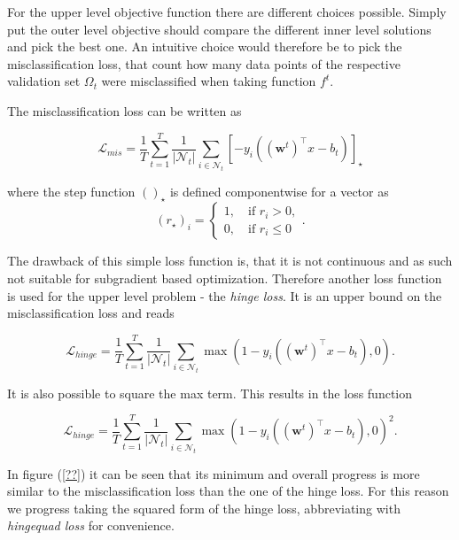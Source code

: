 For the upper level objective function there are different choices possible.
Simply put the outer level objective should compare the different inner level solutions and pick the best one. An intuitive choice would therefore be to pick the misclassification loss, that count how many data points of the respective validation set \(\Omega_t\) were misclassified when taking function \(f^t\).

The misclassification loss can be written as

\begin{equation}
	\mathcal{L}_{mis} = \frac{1}{T}\sum_{t=1}^T\frac{1}{|\mathcal{N}_t|}\sum_{i \in \mathcal{N}_t}{\left[-y_i((\bm{w}^t)^{\top}x-b_t)\right]_{\star}}
\label{misclass_loss}
\end{equation}

where the step function \(()_{\star}\) is defined componentwise for a vector as
\begin{equation}
	(r_{\star})_i = \left\{\begin{array}{c} 1, \quad \text{if } r_i > 0, \\ 0, \quad \text{if } r_i \leq 0 \end{array} \right. .
\label{step_fun}
\end{equation}

The drawback of this simple loss function is, that it is not continuous and as such not suitable for subgradient based optimization. Therefore another loss function is used for the upper level problem - the \emph{hinge loss}. It is an upper bound on the misclassification loss and reads

\begin{equation}
		\mathcal{L}_{hinge} = \frac{1}{T}\sum_{t=1}^T\frac{1}{|\mathcal{N}_t|}\sum_{i \in \mathcal{N}_t}{\max\left(1-y_i((\bm{w}^t)^{\top}x-b_t),0\right)}.
\label{hinge_loss}
\end{equation}

It is also possible to square the max term. This results in the loss function

\begin{equation}
		\mathcal{L}_{hinge} = \frac{1}{T}\sum_{t=1}^T\frac{1}{|\mathcal{N}_t|}\sum_{i \in \mathcal{N}_t}{\max\left(1-y_i((\bm{w}^t)^{\top}x-b_t),0\right)^2}.
\label{hingequad_loss}
\end{equation}

In figure (\ref{??}) it can be seen that its minimum and overall progress is more similar to the misclassification loss than the one of the hinge loss. For this reason we progress taking the squared form of the hinge loss, abbreviating with \emph{hingequad loss} for convenience.

